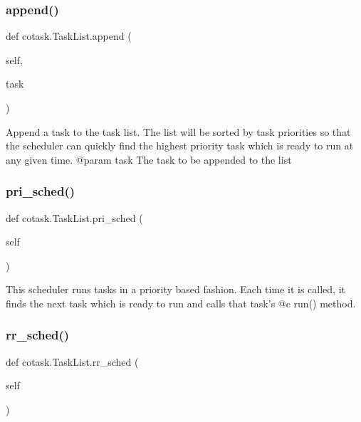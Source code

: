 \subsubsection{\texorpdfstring{append()}{append()}}
{\footnotesize\ttfamily def cotask.\+Task\+List.\+append (\begin{DoxyParamCaption}\item[{}]{self,  }\item[{}]{task }\end{DoxyParamCaption})}

\begin{DoxyVerb}Append a task to the task list. The list will be sorted by task 
priorities so that the scheduler can quickly find the highest priority
task which is ready to run at any given time. 
@param task The task to be appended to the list \end{DoxyVerb}
 \mbox{\label{classcotask_1_1TaskList_a5f7b264614e8e22c28d4c1509e3f30d8}} 
\subsubsection{\texorpdfstring{pri\+\_\+sched()}{pri\_sched()}}
{\footnotesize\ttfamily def cotask.\+Task\+List.\+pri\+\_\+sched (\begin{DoxyParamCaption}\item[{}]{self }\end{DoxyParamCaption})}

\begin{DoxyVerb}This scheduler runs tasks in a priority based fashion. Each time 
it is called, it finds the next task which is ready to run and calls 
that task's @c run() method. \end{DoxyVerb}
 \mbox{\label{classcotask_1_1TaskList_a01614098aedc87b465d5525c6ccb47ce}} 
\subsubsection{\texorpdfstring{rr\+\_\+sched()}{rr\_sched()}}
{\footnotesize\ttfamily def cotask.\+Task\+List.\+rr\+\_\+sched (\begin{DoxyParamCaption}\item[{}]{self }\end{DoxyParamCaption})}

